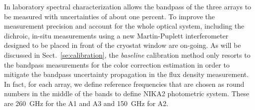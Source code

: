 {\lp In laboratory spectral characterization allows the bandpass of the
three arrays to be measured with uncertainties of about one
percent. To improve the measurement precision and account for the
whole optical system, including the dichroic, in-situ measurements
using a new Martin-Puplett interferometer designed to be placed in
front of the cryostat window are on-going. As will be discussed in
Sect.~\ref{se:calibration}, the \emph{baseline} calibration method
only resorts to the bandpass measurements for the color correction
estimation in order to mitigate the bandpass uncertainty propagation
in the flux density measurement.}
In fact, for each array, we define reference frequencies that are chosen
as round numbers in the middle of the bands to define NIKA2
photometric system. These are 260~GHz for the A1 and A3 and
150~GHz for A2.
